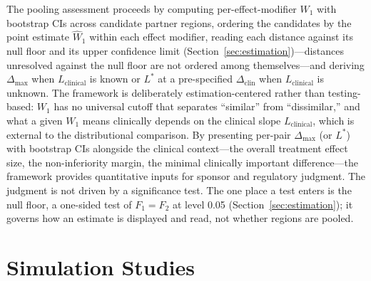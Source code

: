 \documentclass[AMA,Times1COL]{WileyNJDv5}
\begin{document}
The pooling assessment proceeds by computing per-effect-modifier $W_1$ with bootstrap CIs across candidate partner regions, ordering the candidates by the point estimate $\widehat{W}_1$ within each effect modifier, reading each distance against its null floor and its upper confidence limit (Section~\ref{sec:estimation})---distances unresolved against the null floor are not ordered among themselves---and deriving $\Delta_{\max}$ when $L_{\text{clinical}}$ is known or $L^*$ at a pre-specified $\Delta_{\text{clin}}$ when $L_{\text{clinical}}$ is unknown. The framework is deliberately estimation-centered rather than testing-based: $W_1$ has no universal cutoff that separates ``similar'' from ``dissimilar,'' and what a given $W_1$ means clinically depends on the clinical slope $L_{\text{clinical}}$, which is external to the distributional comparison. By presenting per-pair $\Delta_{\max}$ (or $L^*$) with bootstrap CIs alongside the clinical context---the overall treatment effect size, the non-inferiority margin, the minimal clinically important difference---the framework provides quantitative inputs for sponsor and regulatory judgment. The judgment is not driven by a significance test.\cite{wasserstein2016} The one place a test enters is the null floor, a one-sided test of $F_1 = F_2$ at level 0.05 (Section~\ref{sec:estimation}); it governs how an estimate is displayed and read, not whether regions are pooled.

\section{Simulation Studies}\label{sec:simulation}
\end{document}
